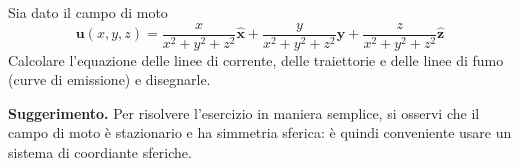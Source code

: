 \begin{exerciseS}
 Sia dato il campo di moto
\begin{equation}
 \bm{u}(x,y,z) = \frac{x}{x^2 + y^2 + z^2} \bm{\hat{x}} +
                 \frac{y}{x^2 + y^2 + z^2} \bm{\hat{y}} +
                 \frac{z}{x^2 + y^2 + z^2} \bm{\hat{z}}
\end{equation}
Calcolare l'equazione delle linee di corrente, delle traiettorie e delle linee di fumo (curve di emissione) e disegnarle.
\end{exerciseS}


% 




\textbf{Suggerimento.}
Per risolvere l'esercizio in maniera semplice, si osservi che il campo di moto è stazionario e ha simmetria sferica: è quindi conveniente usare un sistema di coordiante sferiche.



% 
